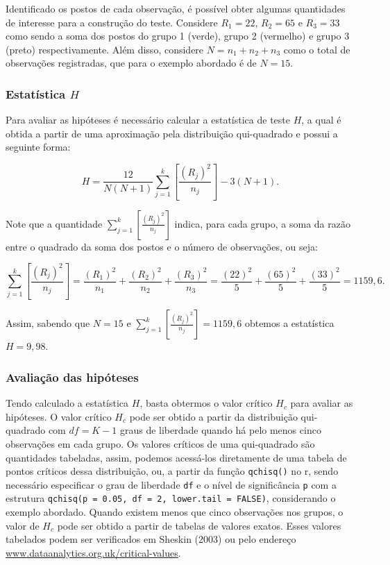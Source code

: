 \documentclass[
  letterpaper,
  DIV=11,
  numbers=noendperiod]{scrreprt}
\begin{document}
Identificado os postos de cada observação, é possível obter algumas
quantidades de interesse para a construção do teste. Considere
\(R_1 = 22\), \(R_2 = 65\) e \(R_3 = 33\) como sendo a soma dos postos
do grupo 1 (verde), grupo 2 (vermelho) e grupo 3 (preto)
respectivamente. Além disso, considere \(N = n_1 + n_2 + n_3\) como o
total de observações registradas, que para o exemplo abordado é de
\(N = 15\).

\hypertarget{estatuxedstica-h}{%
\subsubsection{\texorpdfstring{Estatística
\(H\)}{Estatística H}}\label{estatuxedstica-h}}

Para avaliar as hipóteses é necessário calcular a estatística de teste
\(H\), a qual é obtida a partir de uma aproximação pela distribuição
qui-quadrado e possui a seguinte forma:

\[H=\displaystyle \frac{12}{N(N+1)} \sum_{j=1}^k\left[\displaystyle \frac{\left(R_j\right)^2}{n_j}\right]-3(N+1).\]

Note que a quantidade
\(\sum_{j=1}^k\left[\displaystyle \frac{\left(R_j\right)^2}{n_j}\right]\)
indica, para cada grupo, a soma da razão entre o quadrado da soma dos
postos e o número de observações, ou seja:

\[\sum_{j=1}^k\left[\displaystyle \frac{\left(R_j\right)^2}{n_j}\right] = \displaystyle \frac{\left(R_1\right)^2}{n_1} + \displaystyle \frac{\left(R_2\right)^2}{n_2} + \displaystyle \frac{\left(R_3\right)^2}{n_3} = \displaystyle \frac{\left(22\right)^2}{5} + \displaystyle \frac{\left(65\right)^2}{5} + \displaystyle \frac{\left(33\right)^2}{5} = 1159,6.\]

Assim, sabendo que \(N = 15\) e
\(\sum_{j=1}^k\left[\displaystyle \frac{\left(R_j\right)^2}{n_j}\right] = 1159,6\)
obtemos a estatística \(H = 9,98\).

\hypertarget{avaliauxe7uxe3o-das-hipuxf3teses-2}{%
\subsubsection{Avaliação das
hipóteses}\label{avaliauxe7uxe3o-das-hipuxf3teses-2}}

Tendo calculado a estatística \(H\), basta obtermos o valor crítico
\(H_c\) para avaliar as hipóteses. O valor crítico \(H_c\) pode ser
obtido a partir da distribuição qui-quadrado com \(df = K-1\) graus de
liberdade quando há pelo menos cinco observações em cada grupo. Os
valores críticos de uma qui-quadrado são quantidades tabeladas, assim,
podemos acessá-los diretamente de uma tabela de pontos críticos dessa
distribuição, ou, a partir da função \texttt{qchisq()} no r, sendo
necessário especificar o grau de liberdade \texttt{df} e o nível de
significância \texttt{p} com a estrutura
\texttt{qchisq(p\ =\ 0.05,\ df\ =\ 2,\ lower.tail\ =\ FALSE)},
considerando o exemplo abordado. Quando existem menos que cinco
observações nos grupos, o valor de \(H_c\) pode ser obtido a partir de
tabelas de valores exatos. Esses valores tabelados podem ser verificados
em Sheskin (2003) ou pelo endereço
\href{https://www.dataanalytics.org.uk/critical-values-for-the-kruskal-wallis-test/}{www.dataanalytics.org.uk/critical-values}.
\end{document}
